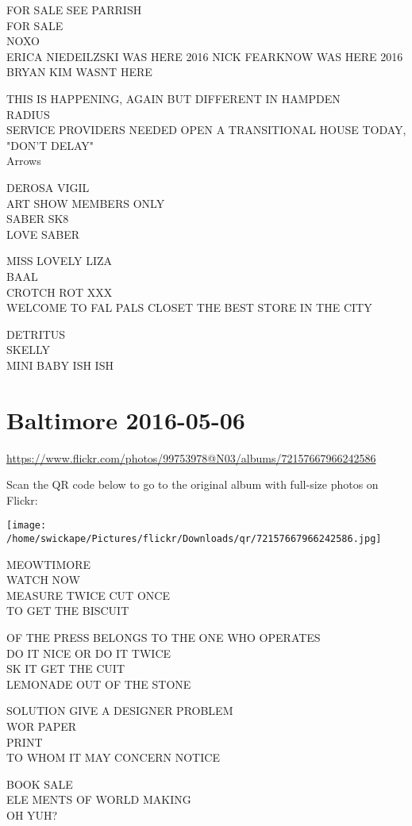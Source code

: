 \documentclass[10pt,letterpaper]{article}
\begin{document}
FOR SALE SEE PARRISH\\
FOR SALE\\
NOXO\\
ERICA NIEDEILZSKI WAS HERE 2016 NICK FEARKNOW WAS HERE 2016 BRYAN KIM WASNT HERE

THIS IS HAPPENING, AGAIN BUT DIFFERENT IN HAMPDEN\\
RADIUS\\
SERVICE PROVIDERS NEEDED OPEN A TRANSITIONAL HOUSE TODAY, "DON'T DELAY"\\
Arrows

DEROSA VIGIL\\
ART SHOW MEMBERS ONLY\\
SABER SK8\\
LOVE SABER

MISS LOVELY LIZA\\
BAAL\\
CROTCH ROT XXX\\
WELCOME TO FAL PALS CLOSET THE BEST STORE IN THE CITY

DETRITUS\\
SKELLY\\
MINI BABY ISH ISH


\section*{Baltimore 2016-05-06}

\url{https://www.flickr.com/photos/99753978@N03/albums/72157667966242586}

Scan the QR code below to go to the original album with full-size photos on Flickr:

\texttt{[image: /home/swickape/Pictures/flickr/Downloads/qr/72157667966242586.jpg]}


MEOWTIMORE\\
WATCH NOW\\
MEASURE TWICE CUT ONCE\\
TO GET THE BISCUIT

OF THE PRESS BELONGS TO THE ONE WHO OPERATES\\
DO IT NICE OR DO IT TWICE\\
SK IT GET THE CUIT\\
LEMONADE OUT OF THE STONE

SOLUTION GIVE A DESIGNER PROBLEM\\
WOR PAPER\\
PRINT\\
TO WHOM IT MAY CONCERN NOTICE

BOOK SALE\\
ELE MENTS OF WORLD MAKING\\
OH YUH?
\end{document}
